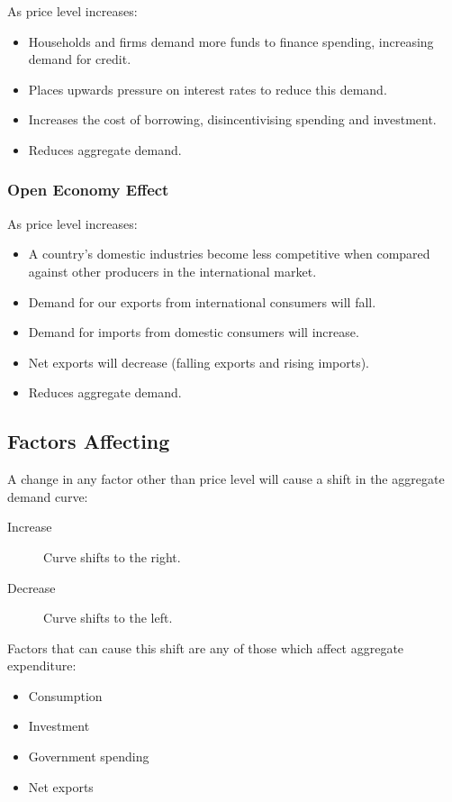 \documentclass[a4paper,11pt]{article}
\begin{document}
As price level increases:

\begin{itemize}
\item Households and firms demand more funds to finance spending, increasing
	demand for credit.
\item Places upwards pressure on interest rates to reduce this demand.
\item Increases the cost of borrowing, disincentivising spending and investment.
\item Reduces aggregate demand.
\end{itemize}


\subsubsection{Open Economy Effect}

As price level increases:

\begin{itemize}
\item A country's domestic industries become less competitive when compared
	against other producers in the international market.
\item Demand for our exports from international consumers will fall.
\item Demand for imports from domestic consumers will increase.
\item Net exports will decrease (falling exports and rising imports).
\item Reduces aggregate demand.
\end{itemize}


\subsection{Factors Affecting}

A change in any factor other than price level will cause a shift in the
aggregate demand curve:

\begin{description}
\item [Increase] Curve shifts to the right.
\item [Decrease] Curve shifts to the left.
\end{description}

Factors that can cause this shift are any of those which affect aggregate
expenditure:

\begin{itemize}
\item Consumption
\item Investment
\item Government spending
\item Net exports
\end{itemize}
\end{document}
